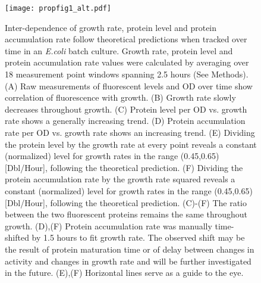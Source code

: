 \documentclass[a4page,notitlepage]{article}
\begin{document}
\begin{figure}[h]
\texttt{[image: propfig1\_alt.pdf]}
\caption{Inter-dependence of growth rate, protein level and protein accumulation rate follow theoretical predictions when tracked over time in an \emph{E.coli} batch culture.
Growth rate, protein level and protein accumulation rate values were calculated by averaging over 18 measurement point windows spanning 2.5 hours (See Methods).
(A) Raw measurements of fluorescent levels and OD over time show correlation of fluorescence with growth.
(B) Growth rate slowly decreases throughout growth.
(C) Protein level per OD vs. growth rate shows a generally increasing trend.
(D) Protein accumulation rate per OD vs. growth rate shows an increasing trend.
(E) Dividing the protein level by the growth rate at every point reveals a constant (normalized) level for growth rates in the range (0.45,0.65)[Dbl/Hour], following the theoretical prediction.
(F) Dividing the protein accumulation rate by the growth rate squared reveals a constant (normalized) level for growth rates in the range (0.45,0.65)[Dbl/Hour], following the theoretical prediction.
(C)-(F) The ratio between the two fluorescent proteins remains the same throughout growth.
(D),(F) Protein accumulation rate was manually time-shifted by 1.5 hours to fit growth rate.
The observed shift may be the result of protein maturation time or of delay between changes in activity and changes in growth rate and will be further investigated in the future.
(E),(F) Horizontal lines serve as a guide to the eye.
}
\label{time-gr-fig}
\end{figure}
\end{document}
